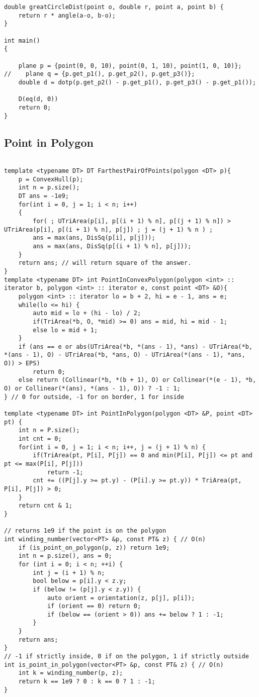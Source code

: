 \documentclass[10pt,a4paper,onesided]{article}
\begin{document}
\begin{multicols*}{3}
\begin{lstlisting}
double greatCircleDist(point o, double r, point a, point b) {
    return r * angle(a-o, b-o);
}

int main()
{

    plane p = {point(0, 0, 10), point(0, 1, 10), point(1, 0, 10)};
//    plane q = {p.get_p1(), p.get_p2(), p.get_p3()};
    double d = dotp(p.get_p2() - p.get_p1(), p.get_p3() - p.get_p1());

    D(eq(d, 0))
    return 0;
}

\end{lstlisting}
\subsection{Point in Polygon}
\begin{lstlisting}

template <typename DT> DT FarthestPairOfPoints(polygon <DT> p){
    p = ConvexHull(p);
    int n = p.size();
    DT ans = -1e9;
    for(int i = 0, j = 1; i < n; i++)
    {   
        for( ; UTriArea(p[i], p[(i + 1) % n], p[(j + 1) % n]) > UTriArea(p[i], p[(i + 1) % n], p[j]) ; j = (j + 1) % n ) ;
        ans = max(ans, DisSq(p[i], p[j]));
        ans = max(ans, DisSq(p[(i + 1) % n], p[j]));
    }
    return ans; // will return square of the answer.
}
template <typename DT> int PointInConvexPolygon(polygon <int> :: iterator b, polygon <int> :: iterator e, const point <DT> &O){
    polygon <int> :: iterator lo = b + 2, hi = e - 1, ans = e;
    while(lo <= hi) {
        auto mid = lo + (hi - lo) / 2;
        if(TriArea(*b, O, *mid) >= 0) ans = mid, hi = mid - 1;
        else lo = mid + 1;
    }
    if (ans == e or abs(UTriArea(*b, *(ans - 1), *ans) - UTriArea(*b, *(ans - 1), O) - UTriArea(*b, *ans, O) - UTriArea(*(ans - 1), *ans, O)) > EPS)
        return 0;
    else return (Collinear(*b, *(b + 1), O) or Collinear(*(e - 1), *b, O) or Collinear(*(ans), *(ans - 1), O)) ? -1 : 1;
} // 0 for outside, -1 for on border, 1 for inside

template <typename DT> int PointInPolygon(polygon <DT> &P, point <DT> pt) {
    int n = P.size();
    int cnt = 0;
    for(int i = 0, j = 1; i < n; i++, j = (j + 1) % n) {
        if(TriArea(pt, P[i], P[j]) == 0 and min(P[i], P[j]) <= pt and pt <= max(P[i], P[j]))
            return -1;
        cnt += ((P[j].y >= pt.y) - (P[i].y >= pt.y)) * TriArea(pt, P[i], P[j]) > 0; 
    }
    return cnt & 1;
}

// returns 1e9 if the point is on the polygon 
int winding_number(vector<PT> &p, const PT& z) { // O(n)
    if (is_point_on_polygon(p, z)) return 1e9;
    int n = p.size(), ans = 0;
    for (int i = 0; i < n; ++i) {
        int j = (i + 1) % n;
        bool below = p[i].y < z.y;
        if (below != (p[j].y < z.y)) {
            auto orient = orientation(z, p[j], p[i]);
            if (orient == 0) return 0;
            if (below == (orient > 0)) ans += below ? 1 : -1;
        }
    }
    return ans;
}
// -1 if strictly inside, 0 if on the polygon, 1 if strictly outside
int is_point_in_polygon(vector<PT> &p, const PT& z) { // O(n)
    int k = winding_number(p, z);
    return k == 1e9 ? 0 : k == 0 ? 1 : -1;
}\end{lstlisting}

\end{multicols*}
\end{document}
